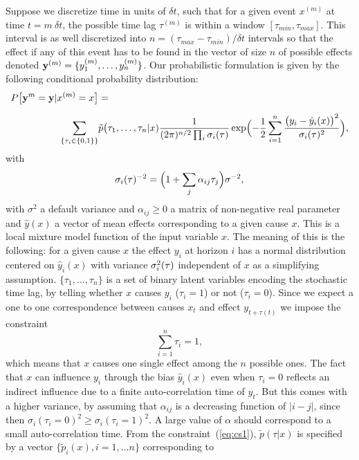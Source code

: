 \documentclass[envcountsect,runningheads]{llncs}
\theoremstyle{etoile}
\begin{document}
Suppose we discretize time in units of $\delta t$, such that for a given event $x^{(m)}$ at time  $t = m\ \delta t$, the possible time lag $\tau^{(m)}$ is within a window
$[\tau_{min},\tau_{max}]$. This interval is as well discretized into $n = (\tau_{max}-\tau_{min})/\delta t $ intervals so that the effect if any of this event has to be found in the vector of size $n$ of
possible effects denoted ${\bf y}^{(m)} = \{y_1^{(m)},\ldots,y_n^{(m)}\}$.
Our probabilistic formulation is given by the following conditional probability distribution:
\begin{align}
  P\bigl[{\bf y}^{m} = {\bf y}\vert x^{(m)}=x\bigr] &= \nonumber\\[0.2cm]
  \sum_{\{\tau_i\in\{0,1\}\}} & \tilde p\bigl(\tau_1,\ldots,\tau_n\vert x)
\frac{1}{(2\pi)^{n/2}\prod_i\sigma_i({\bf \tau})}
\exp\Bigl(-\frac{1}{2}\sum_{i=1}^n\frac{\bigl(y_i-\hat y_i(x)\bigr)^2}{\sigma_i({\bf \tau})^2}\Bigr),\label{eq:py}
\end{align}
with 
\[
\sigma_i({\bf \tau})^{-2} = \Bigl(1+\sum_j\alpha_{ij} \tau_j\Bigr)\sigma^{-2},
\]
with $\sigma^2$ a default variance and $\alpha_{ij}\ge 0$ a matrix of non-negative real parameter and $\hat y(x)$ a vector of mean effects corresponding to a given cause $x$. 
This is a local mixture model function of the input variable $x$.
The meaning of this is the following: for a given cause $x$ the effect
$y_i$ at horizon $i$ has a normal distribution centered on $\hat y_i(x)$ with  variance $\sigma_i^2({\bf \tau})$ independent of $x$ as a simplifying assumption. $\{\tau_1,\ldots,\tau_n\}$ is a set of binary
latent variables encoding the stochastic time lag, by telling whether $x$ causes $y_i$ ($\tau_i=1$) or not ($\tau_i=0$). Since we expect a one to one correspondence between causes
$x_t$ and effect $y_{t+\tau(t)}$ we impose the constraint
\begin{equation}\label{eq:cs1}
\sum_{i=1}^n \tau_i = 1,
\end{equation}
which means that $x$ causes one single effect among the $n$ possible ones. The fact that $x$ can influence $y_i$ through the bias $\hat y_i(x)$ even when $\tau_i=0$ reflects an indirect
influence due to a finite auto-correlation time of $y_t$. But this comes with a higher variance, by assuming that $\alpha_{ij}$ is a decreasing function of $\vert i-j\vert$, 
since then $\sigma_i(\tau_i=0)^2\ge \sigma_i(\tau_i=1)^2$.
A large value of $\alpha$ should correspond to a small auto-correlation time. From the constraint~(\ref{eq:cs1}), $\tilde p(\tau\vert x)$ is specified by  a vector
$\{\tilde p_i(x),i=1,\dots n\}$ corresponding to
\end{document}
